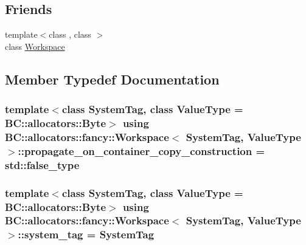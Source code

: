 \subsection*{Friends}
\begin{DoxyCompactItemize}
\item 
{\footnotesize template$<$class , class $>$ }\\class \hyperlink{classBC_1_1allocators_1_1fancy_1_1Workspace_a7a3ab453bfe60cd714a4ff1f88cdb79b}{Workspace}
\end{DoxyCompactItemize}


\subsection{Member Typedef Documentation}
\subsubsection[{\texorpdfstring{propagate\+\_\+on\+\_\+container\+\_\+copy\+\_\+construction}{propagate_on_container_copy_construction}}]{\setlength{\rightskip}{0pt plus 5cm}template$<$class System\+Tag, class Value\+Type = B\+C\+::allocators\+::\+Byte$>$ using {\bf B\+C\+::allocators\+::fancy\+::\+Workspace}$<$ System\+Tag, Value\+Type $>$\+::{\bf propagate\+\_\+on\+\_\+container\+\_\+copy\+\_\+construction} =  std\+::false\+\_\+type}\hypertarget{classBC_1_1allocators_1_1fancy_1_1Workspace_a035ffccb59a4b0b777d979e4a5afb69b}{}\label{classBC_1_1allocators_1_1fancy_1_1Workspace_a035ffccb59a4b0b777d979e4a5afb69b}
\subsubsection[{\texorpdfstring{system\+\_\+tag}{system_tag}}]{\setlength{\rightskip}{0pt plus 5cm}template$<$class System\+Tag, class Value\+Type = B\+C\+::allocators\+::\+Byte$>$ using {\bf B\+C\+::allocators\+::fancy\+::\+Workspace}$<$ System\+Tag, Value\+Type $>$\+::{\bf system\+\_\+tag} =  System\+Tag}\hypertarget{classBC_1_1allocators_1_1fancy_1_1Workspace_a55a7cc23b201c017e708a7f9e06ecaa7}{}\label{classBC_1_1allocators_1_1fancy_1_1Workspace_a55a7cc23b201c017e708a7f9e06ecaa7}
